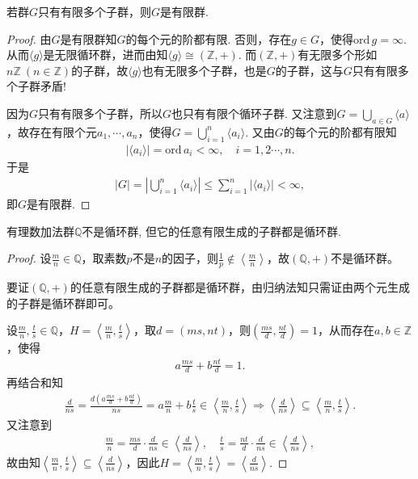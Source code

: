 \documentclass[../../main.tex]{subfiles}%
\begin{document}
\begin{example}
若群$G$只有有限多个子群，则$G$是有限群.
\end{example}
\begin{proof}
由$G$是有限群知$G$的每个元的阶都有限. 否则，存在$g\in G$，使得$\mathrm{ord}\,g=\infty$. 从而$\langle g \rangle$是无限循环群，进而由知$\langle g \rangle \cong (\mathbb{Z},+)$. 而$(\mathbb{Z},+)$有无限多个形如$n\mathbb{Z} \ (n\in\mathbb{Z})$的子群，故$\langle g \rangle$也有无限多个子群，也是$G$的子群，这与$G$只有有限多个子群矛盾!

因为$G$只有有限多个子群，所以$G$也只有有限个循环子群. 又注意到$G=\bigcup\limits_{a\in G}\langle a \rangle$，故存在有限个元$a_1,\cdots,a_n$，使得$G=\bigcup\limits_{i=1}^n\langle a_i \rangle$. 又由$G$的每个元的阶都有限知
\begin{align*}
\left| \langle a_i \rangle \right|=\mathrm{ord}\,a_i<\infty ,\quad i=1,2\cdots ,n.
\end{align*}
于是
\begin{align*}
\left| G \right|=\left| \bigcup\limits_{i=1}^n\langle a_i \rangle \right|\leqslant \sum\limits_{i=1}^n\left| \langle a_i \rangle \right|<\infty ,
\end{align*}
即$G$是有限群.
\end{proof}

\begin{example}
有理数加法群$\mathbb{Q}$不是循环群, 但它的任意有限生成的子群都是循环群.
\end{example}
\begin{proof}
设$\frac{m}{n}\in\mathbb{Q}$，取素数$p$不是$n$的因子，则$\frac{1}{p}\notin\left<\frac{m}{n}\right>$，故$(\mathbb{Q},+)$不是循环群。

要证$(\mathbb{Q},+)$的任意有限生成的子群都是循环群，由归纳法知只需证由两个元生成的子群是循环群即可。

设$\frac{m}{n},\frac{t}{s}\in\mathbb{Q}$，$H=\left<\frac{m}{n},\frac{t}{s}\right>$，取$d=(ms,nt)$，则$\left(\frac{ms}{d},\frac{nt}{d}\right)=1$，从而存在$a,b\in\mathbb{Z}$，使得
\begin{align*}
a\frac{ms}{d}+b\frac{nt}{d}=1.
\end{align*}
再结合和知
\begin{align*}
\frac{d}{ns}=\frac{d\left(a\frac{ms}{d}+b\frac{nt}{d}\right)}{ns}=a\frac{m}{n}+b\frac{t}{s}\in\left<\frac{m}{n},\frac{t}{s}\right>\Longrightarrow\left<\frac{d}{ns}\right>\subseteq\left<\frac{m}{n},\frac{t}{s}\right>.
\end{align*}
又注意到
\begin{align*}
\frac{m}{n}=\frac{ms}{d}\cdot\frac{d}{ns}\in\left<\frac{d}{ns}\right>,\quad\frac{t}{s}=\frac{nt}{d}\cdot\frac{d}{ns}\in\left<\frac{d}{ns}\right>,
\end{align*}
故由知$\left<\frac{m}{n},\frac{t}{s}\right>\subseteq\left<\frac{d}{ns}\right>$，因此$H=\left<\frac{m}{n},\frac{t}{s}\right>=\left<\frac{d}{ns}\right>$.
\end{proof}
\end{document}
